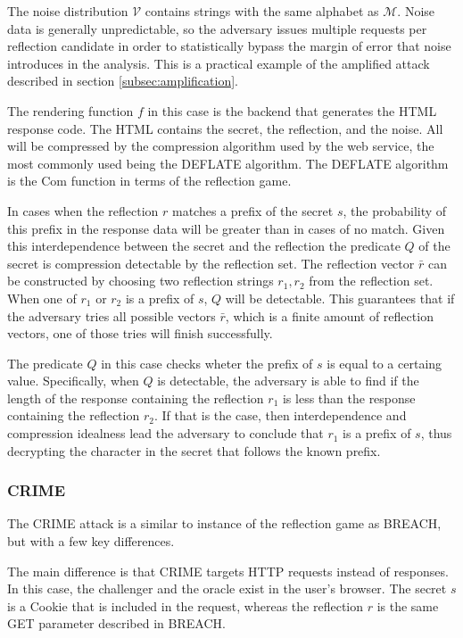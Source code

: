 \documentclass[conference, letterpaper, 10pt]{IEEEtran}
\begin{document}
The noise distribution $\mathcal{V}$ contains strings with the same alphabet as
$\mathcal{M}$. Noise data is generally unpredictable, so the adversary issues
multiple requests per reflection candidate in order to statistically bypass the
margin of error that noise introduces in the analysis. This is a practical
example of the amplified attack described in section \ref{subsec:amplification}.

The rendering function $f$ in this case is the backend that generates the HTML
response code. The HTML contains the secret, the reflection, and the noise. All
will be compressed by the compression algorithm used by the web service, the
most commonly used being the DEFLATE algorithm. The DEFLATE algorithm is the
$\textrm{Com}$ function in terms of the reflection game.

In cases when the reflection $r$ matches a prefix of the secret $s$, the
probability of this prefix in the response data will be greater than in cases of
no match. Given this interdependence between the secret and the reflection the
predicate $Q$ of the secret is compression detectable by the reflection set. The
reflection vector $\bar{r}$ can be constructed by choosing two reflection
strings $r_1, r_2$ from the reflection set. When one of $r_1$ or $r_2$ is a
prefix of $s$, $Q$ will be detectable. This guarantees that if the adversary
tries all possible vectors $\bar{r}$, which is a finite amount of reflection
vectors, one of those tries will finish successfully.

The predicate $Q$ in this case checks wheter the prefix of $s$ is equal to a
certaing value. Specifically, when $Q$ is detectable, the adversary is able to
find if the length of the response containing the reflection $r_1$ is less than
the response containing the reflection $r_2$. If that is the case, then
interdependence and compression idealness lead the adversary to conclude that
$r_1$ is a prefix of $s$, thus decrypting the character in the secret that
follows the known prefix.

\subsubsection{CRIME}
The CRIME attack is a similar to instance of the reflection game as BREACH, but
with a few key differences.

The main difference is that CRIME targets HTTP requests instead of responses. In
this case, the challenger and the oracle exist in the user's browser. The secret
$s$ is a Cookie that is included in the request, whereas the reflection $r$ is
the same GET parameter described in BREACH.
\end{document}

